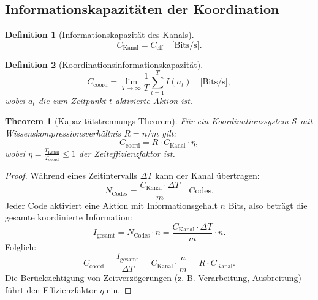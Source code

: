\documentclass[12pt]{article}
\newtheorem{definition}{Definition}
\newtheorem{theorem}{Theorem}
\begin{document}
	\subsection{Informationskapazitäten der Koordination}
	\label{app:capacities}
	
	\begin{definition}[Informationskapazität des Kanals]
		\[
		C_{\text{Kanal}} = C_{\text{eff}} \quad \text{[Bits/s]}.
		\]
	\end{definition}
	
	\begin{definition}[Koordinationsinformationskapazität]
		\[
		C_{\text{coord}} = \lim_{T \to \infty} \frac{1}{T} \sum_{t=1}^{T} I(a_t) \quad \text{[Bits/s]},
		\]
		wobei $a_t$ die zum Zeitpunkt $t$ aktivierte Aktion ist.
	\end{definition}
	
	\begin{theorem}[Kapazitätstrennungs-Theorem]
		\label{thm:capacity-separation}
		Für ein Koordinationssystem $\mathcal{S}$ mit Wissenskompressionsverhältnis $R = n/m$ gilt:
		\[
		C_{\text{coord}} = R \cdot C_{\text{Kanal}} \cdot \eta,
		\]
		wobei $\eta = \frac{T_{\text{Kanal}}}{T_{\text{coord}}} \leq 1$ der Zeiteffizienzfaktor ist.
	\end{theorem}
	
	\begin{proof}
		Während eines Zeitintervalls $\Delta T$ kann der Kanal übertragen:
		\[
		N_{\text{Codes}} = \frac{C_{\text{Kanal}} \cdot \Delta T}{m} \quad \text{Codes}.
		\]
		Jeder Code aktiviert eine Aktion mit Informationsgehalt $n$ Bits, also beträgt die gesamte koordinierte Information:
		\[
		I_{\text{gesamt}} = N_{\text{Codes}} \cdot n = \frac{C_{\text{Kanal}} \cdot \Delta T}{m} \cdot n.
		\]
		Folglich:
		\[
		C_{\text{coord}} = \frac{I_{\text{gesamt}}}{\Delta T} = C_{\text{Kanal}} \cdot \frac{n}{m} = R \cdot C_{\text{Kanal}}.
		\]
		Die Berücksichtigung von Zeitverzögerungen (z. B. Verarbeitung, Ausbreitung) führt den Effizienzfaktor $\eta$ ein.
	\end{proof}
	
\end{document}
